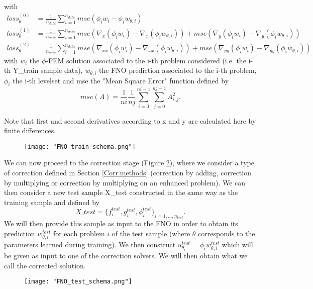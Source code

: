 \begin{enumerate}[label=\textbullet]
\begin{equation*}
	\end{equation*}
	with 
	\begin{align*}
		loss_\theta^{(0)} &= \frac{1}{n_{data}}\sum_{i=1}^{n_{data}} mse(\phi_iw_i-\phi_iw_{\theta,i}) \\
		loss_\theta^{(1)} &= \frac{1}{n_{data}}\sum_{i=1}^{n_{data}} mse(\nabla_x(\phi_iw_i)-\nabla_x(\phi_iw_{\theta,i}))+mse(\nabla_y(\phi_iw_i)-\nabla_y(\phi_iw_{\theta,i})) \\
		loss_\theta^{(2)} &= \frac{1}{n_{data}}\sum_{i=1}^{n_{data}} mse(\nabla_{xx}(\phi_iw_i)-\nabla_{xx}(\phi_iw_{\theta,i})) + mse(\nabla_{yy}(\phi_iw_i)-\nabla_{yy}(\phi_iw_{\theta,i}))
	\end{align*}
	with $w_i$ the $\phi$-FEM solution associated to the i-th problem considered (i.e. the i-th Y\_train sample data), $w_{\theta,i}$ the FNO prediction associated to the i-th problem, $\phi_i$ the i-th levelset and mse the "Mean Square Error" function defined by
	\begin{equation*}
		mse(A)=\frac{1}{ni}\frac{1}{nj}\sum_{i=0}^{ni-1}\sum_{j=0}^{nj-1}A_{i,j}^2.
	\end{equation*}
	\begin{Rem}
		Note that first and second derivatives according to x and y are calculated here by finite differences.
	\end{Rem}
\end{enumerate}

\begin{figure}[H]
	\centering
	\texttt{[image: "FNO\_train\_schema.png"]}
	\label{FNO_train_schema}
\end{figure}

We can now proceed to the correction stage (Figure \ref{FNO_test_schema}), where we consider a type of correction defined in Section \ref{Corr.methods} (correction by adding, correction by multiplying or correction by multiplying on an enhanced problem). We can then consider a new test sample X\_test constructed in the same way as the training sample and defined by
\begin{equation*}
	X\_test = \{f^{test}_i,g^{test}_i,\phi^{test}_i\}_{i=1,\dots,n_{test}}.
\end{equation*}
We will then provide this sample as input to the FNO in order to obtain its prediction $w^{test}_{\theta,i}$ for each problem $i$ of the test sample (where $\theta$ corresponds to the parameters learned during training). We then construct $u^{test}_{\theta_i}=\phi_i w^{test}_{\theta,i}$ which will be given as input to one of the correction solvers. We will then obtain what we call the corrected solution.

\begin{figure}[H]
	\centering
	\texttt{[image: "FNO\_test\_schema.png"]}
	\label{FNO_test_schema}
\end{figure}




